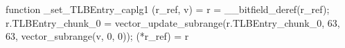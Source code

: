 function _set_TLBEntry_caplg1 (r_ref, v) = {
    r = __bitfield_deref(r_ref);
    r.TLBEntry_chunk_0 = vector_update_subrange(r.TLBEntry_chunk_0, 63, 63, vector_subrange(v, 0, 0));
    (*r_ref) = r
}
